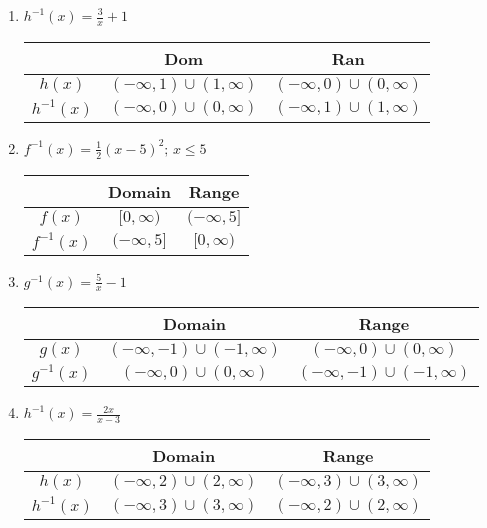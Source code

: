 \begin{enumerate}
\item $h^{-1}(x) = \frac{3}{x} + 1$ \newline\\
    \begin{tabular}{c|c|c}
            &   Dom &   Ran \\  \hline
        $h(x)$  &   $(-\infty, 1) \cup (1, \infty)$  &   $(-\infty, 0) \cup (0, \infty)$    \\[5pt]  \hline
        $h^{-1}(x)$ &   $(-\infty, 0) \cup (0, \infty)$   &   $(-\infty, 1) \cup (1, \infty)$  \\
        \end{tabular}
        
\item $f^{-1}(x) = \frac{1}{2}(x-5)^2; \, x \leq 5$ \newline\\
    
    \begin{tabular}{c|c|c}
                    &   Domain      & Range             \\ \hline
        $f(x)$      & $[0,\infty)$  &   $(-\infty, 5]$  \\  \hline   
        $f^{-1}(x)$ & $(-\infty,5]$ &   $[0,\infty)$  
    \end{tabular}
    
    \item $g^{-1}(x) = \frac{5}{x}-1$   \newline\\
    
    \begin{tabular}{c|c|c}
                    &   Domain      & Range             \\ \hline
        $g(x)$      & $(-\infty,-1)\cup(-1,\infty)$  &   $(-\infty,0)\cup(0,\infty)$  \\  \hline   
        $g^{-1}(x)$ & $(-\infty,0)\cup(0,\infty)$ &   $(-\infty,-1)\cup(-1,\infty)$  
    \end{tabular}
    
    \item $h^{-1}(x) = \frac{2x}{x-3}$    \newline\\
    
    \begin{tabular}{c|c|c}
                    &   Domain      & Range             \\ \hline
        $h(x)$      & $(-\infty,2)\cup(2,\infty)$  &   $(-\infty,3)\cup(3,\infty)$  \\  \hline   
        $h^{-1}(x)$ & $(-\infty,3)\cup(3,\infty)$ &   $(-\infty,2)\cup(2,\infty)$  
    \end{tabular}

    



\end{enumerate}